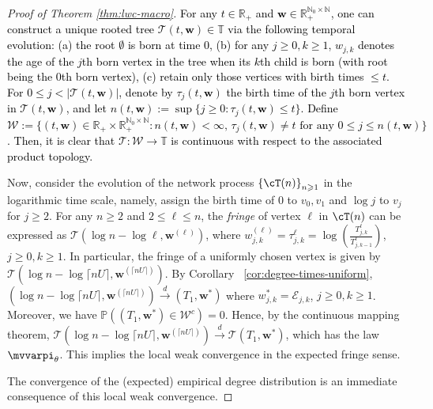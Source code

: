 \documentclass[letterpaper,11pt,reqno]{amsart}
\theoremstyle{definition}
\renewcommand{\le}{\leqslant}
\renewcommand{\ge}{\geqslant}
\renewcommand{\geq}{\geqslant}
\newcommand{\set}[1]{\left\{#1\right\}}
\newcommand{\sE}{\mathscr{E}}
\newcommand{\prob}{\mathbb{P}}
\newcommand{\convd}{\stackrel{d}{\longrightarrow}}
\newcommand{\fpm}{\mvvarpi}
\begin{document}
\begin{proof}[Proof of Theorem \ref{thm:lwc-macro}]
\textcolor{black}{For any $t \in \mathbb{R}_+$ and $\mathbf{w} \in \mathbb{R}_+^{\mathbb{N}_0 \times \mathbb{N}}$, one can construct a unique rooted tree $\mathscr{T}(t,\mathbf{w}) \in \mathbb{T}$ via the following temporal evolution: (a) the root $\emptyset$ is born at time $0$, (b) for any $j \ge 0, k \ge 1$, $w_{j,k}$ denotes the age of the $j$th born vertex in the tree when its $k$th child is born (with root being the $0$th born vertex), (c) retain only those vertices with birth times $\le t$. For $0 \le j < |\mathscr{T}(t,\mathbf{w})|$, denote by $\tau_j(t,\mathbf{w})$ the birth time of the $j$th born vertex in $\mathscr{T}(t,\mathbf{w})$, and let $n(t,\mathbf{w}) := \sup\{j \ge 0 : \tau_j(t,\mathbf{w}) \le t\}$. Define $\mathscr{W} := \{(t,\mathbf{w}) \in  \mathbb{R}_+ \times \mathbb{R}_+^{\mathbb{N}_0 \times \mathbb{N}} : n(t,\mathbf{w}) < \infty, \, \tau_j(t,\mathbf{w}) \neq t \text{ for any } 0 \le j \le n(t,\mathbf{w})\}$. Then, it is clear that $\mathscr{T}: \mathscr{W} \rightarrow \mathbb{T}$ is continuous \textcolor{black}{with respect to the associated product topology.}}

Now, consider the evolution of the network process $\set{\cT(n)}_{n\geq 1}$ in the logarithmic time scale, namely, assign the birth time of $0$ to $v_0,v_1$ and $\log j$ to $v_j$ for $j \ge 2$. For any $n \ge 2$ and $2 \le \ell \le n$, the \emph{fringe} of vertex $\ell$ in $\cT(n)$ can be expressed as $\mathscr{T}(\log n - \log \ell, \mathbf{w}^{(\ell)})$, where $w^{(\ell)}_{j,k} =\tau_{j,k}^\ell = \log\left(\frac{T^\ell_{j,k}}{T^\ell_{j,k-1}}\right)$, $j \ge 0, k \ge 1$. In particular, the fringe of a uniformly chosen vertex is given by
$\mathscr{T}(\log n - \log \lceil n U\rceil, \mathbf{w}^{(\lceil n U\rceil)})$. By Corollary ~\ref{cor:degree-times-uniform}, $(\log n - \log \lceil n U\rceil, \mathbf{w}^{(\lceil n U\rceil)}) \convd (T_1, \mathbf{w}^*)$ where $w^*_{j,k} = \sE_{j,k}$, $j \ge 0, k \ge 1$. Moreover, we have $\prob\left((T_1, \mathbf{w}^*) \in \mathscr{W}^c\right)=0$.
Hence, by the continuous mapping theorem, $\mathscr{T}(\log n - \log \lceil n U\rceil, \mathbf{w}^{(\lceil n U\rceil)}) \convd \mathscr{T}(T_1, \mathbf{w}^*)$, which has the law $\fpm_{\theta}$. This implies the local weak convergence in the expected fringe sense.

The convergence of the (expected) empirical degree distribution is an immediate consequence of this local weak convergence.
\end{proof}
\end{document}
